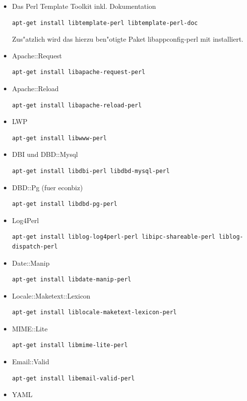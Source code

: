 \documentclass[11pt, twoside, a4paper, BCOR8mm, DIV12, bibtotoc,idxtotoc]{scrbook}
\begin{document}
\begin{itemize}
\item Das Perl Template Toolkit inkl. Dokumentation
\begin{verbatim}
apt-get install libtemplate-perl libtemplate-perl-doc
\end{verbatim}
  Zus"atzlich wird das hierzu ben"otigte Paket libappconfig-perl mit
  installiert.
\item Apache::Request
\begin{verbatim}
apt-get install libapache-request-perl
\end{verbatim}
\item Apache::Reload
\begin{verbatim}
apt-get install libapache-reload-perl
\end{verbatim}
\item LWP
\begin{verbatim}
apt-get install libwww-perl
\end{verbatim}
\item DBI und DBD::Mysql
\begin{verbatim}
apt-get install libdbi-perl libdbd-mysql-perl
\end{verbatim}
\item DBD::Pg (fuer econbiz)
\begin{verbatim}
apt-get install libdbd-pg-perl
\end{verbatim}
\item Log4Perl
\begin{verbatim}
apt-get install liblog-log4perl-perl libipc-shareable-perl liblog-dispatch-perl
\end{verbatim}
\item Date::Manip
\begin{verbatim}
apt-get install libdate-manip-perl
\end{verbatim}
\item Locale::Maketext::Lexicon
\begin{verbatim}
apt-get install liblocale-maketext-lexicon-perl
\end{verbatim}
\item MIME::Lite
\begin{verbatim}
apt-get install libmime-lite-perl
\end{verbatim}
\item Email::Valid
\begin{verbatim}
apt-get install libemail-valid-perl
\end{verbatim}
\item YAML
\begin{verbatim}

\end{verbatim}
\end{itemize}
\end{document}
